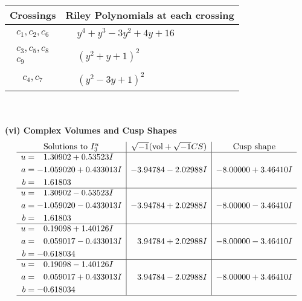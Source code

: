 \documentclass[1p]{elsarticle_modified}
\theoremstyle{definition}
\newcommand{\I}{\sqrt{-1}}
\begin{document}
\begin{tabular}{m{50pt}|m{274pt}}
Crossings & \hspace{64pt}Riley Polynomials at each crossing \\
\hline $$\begin{aligned}c_{1},c_{2},c_{6}\end{aligned}$$&$\begin{aligned}
&y^4+y^3-3 y^2+4 y+16
\end{aligned}$\\
\hline $$\begin{aligned}c_{3},c_{5},c_{8}\\c_{9}\end{aligned}$$&$\begin{aligned}
&(y^2+y+1)^2
\end{aligned}$\\
\hline $$\begin{aligned}c_{4},c_{7}\end{aligned}$$&$\begin{aligned}
&(y^2-3 y+1)^2
\end{aligned}$\\
\hline
\end{tabular}\\~\\
\newpage\flushleft \textbf{(vi) Complex Volumes and Cusp Shapes}
$$\begin{array}{c|c|c}  
\text{Solutions to }I^u_{3}& \I (\text{vol} + \sqrt{-1}CS) & \text{Cusp shape}\\
 \hline 
\begin{aligned}
u &= \phantom{-}1.30902 + 0.53523 I \\
a &= -1.059020 + 0.433013 I \\
b &= \phantom{-}1.61803\phantom{ +0.000000I}\end{aligned}
 & -3.94784 - 2.02988 I & -8.00000 + 3.46410 I \\ \hline\begin{aligned}
u &= \phantom{-}1.30902 - 0.53523 I \\
a &= -1.059020 - 0.433013 I \\
b &= \phantom{-}1.61803\phantom{ +0.000000I}\end{aligned}
 & -3.94784 + 2.02988 I & -8.00000 - 3.46410 I \\ \hline\begin{aligned}
u &= \phantom{-}0.19098 + 1.40126 I \\
a &= \phantom{-}0.059017 - 0.433013 I \\
b &= -0.618034\phantom{ +0.000000I}\end{aligned}
 & \phantom{-}3.94784 + 2.02988 I & -8.00000 - 3.46410 I \\ \hline\begin{aligned}
u &= \phantom{-}0.19098 - 1.40126 I \\
a &= \phantom{-}0.059017 + 0.433013 I \\
b &= -0.618034\phantom{ +0.000000I}\end{aligned}
 & \phantom{-}3.94784 - 2.02988 I & -8.00000 + 3.46410 I\\
 \hline 
 \end{array}$$\newpage\newpage\renewcommand{\arraystretch}{1}
\end{document}
